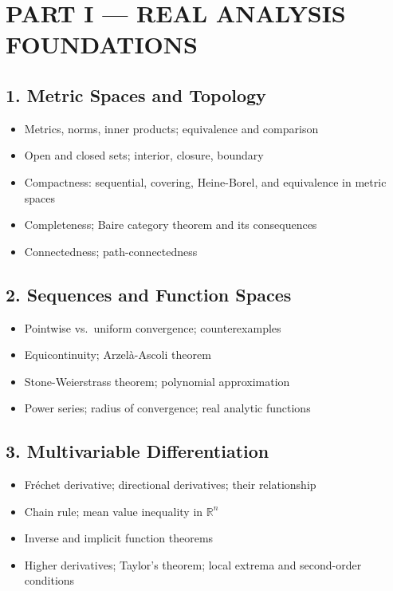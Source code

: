 \section{PART I --- REAL ANALYSIS FOUNDATIONS}

\subsection{1. Metric Spaces and Topology}
\begin{itemize}
\item Metrics, norms, inner products; equivalence and comparison
\item Open and closed sets; interior, closure, boundary
\item Compactness: sequential, covering, Heine-Borel, and equivalence in metric spaces
\item Completeness; Baire category theorem and its consequences
\item Connectedness; path-connectedness
\end{itemize}

\subsection{2. Sequences and Function Spaces}
\begin{itemize}
\item Pointwise vs.\ uniform convergence; counterexamples
\item Equicontinuity; Arzel\`a-Ascoli theorem
\item Stone-Weierstrass theorem; polynomial approximation
\item Power series; radius of convergence; real analytic functions
\end{itemize}

\subsection{3. Multivariable Differentiation}
\begin{itemize}
\item Fr\'echet derivative; directional derivatives; their relationship
\item Chain rule; mean value inequality in $\mathbb{R}^n$
\item Inverse and implicit function theorems
\item Higher derivatives; Taylor's theorem; local extrema and second-order conditions
\end{itemize}

